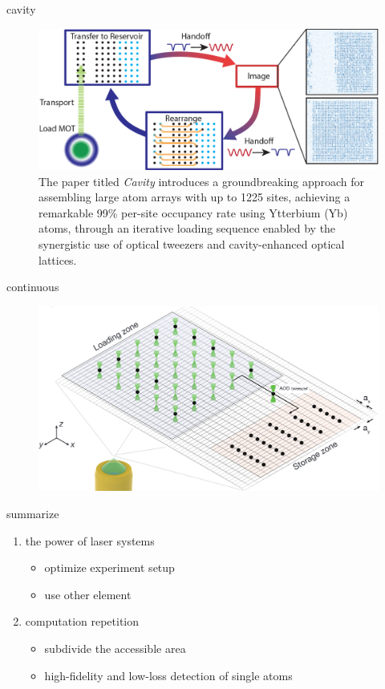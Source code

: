 \documentclass[18 pt]{beamer}
\begin{document}
\begin{frame}{cavity}
\begin{figure}
  \includegraphics[width=\textwidth]{IMG/cavity.png}
  \caption{The paper titled \textit{Cavity} introduces a groundbreaking approach for assembling large atom arrays with up to 1225 sites, achieving a remarkable 99\% per-site occupancy rate using Ytterbium (Yb) atoms, through an iterative loading sequence enabled by the synergistic use of optical tweezers and cavity-enhanced optical lattices.}
\end{figure}
\end{frame}
\begin{frame}{continuous}
  \begin{figure}
    \includegraphics[width=.8\textwidth]{IMG/continus.png}
    \caption{}
  \end{figure}
\end{frame}
\begin{frame}{summarize}
  \begin{enumerate}
    \item the power of laser systems
    \begin{itemize}
      \item optimize experiment setup
      \item use other element
    \end{itemize}
    \item computation repetition
    \begin{itemize}
      \item subdivide the accessible area
      \item high-fidelity and low-loss detection of single atoms
    \end{itemize} 
  \end{enumerate}
\end{frame}
\end{document}
